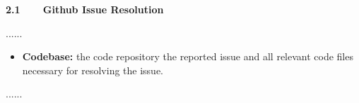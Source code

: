 \documentclass[12pt,american]{article}
\begin{document}
\begin{revresponse}


\end{revresponse}

\begin{changes}
\textbf{2.1~~~~Github Issue Resolution}

......
\begin{itemize}%

    \item \textbf{Codebase:} the code repository  the reported issue and all relevant code files necessary for resolving the issue.
\end{itemize}
......
\end{changes}

% 
\reviewer\label{sec:reviewer2}
\end{document}
